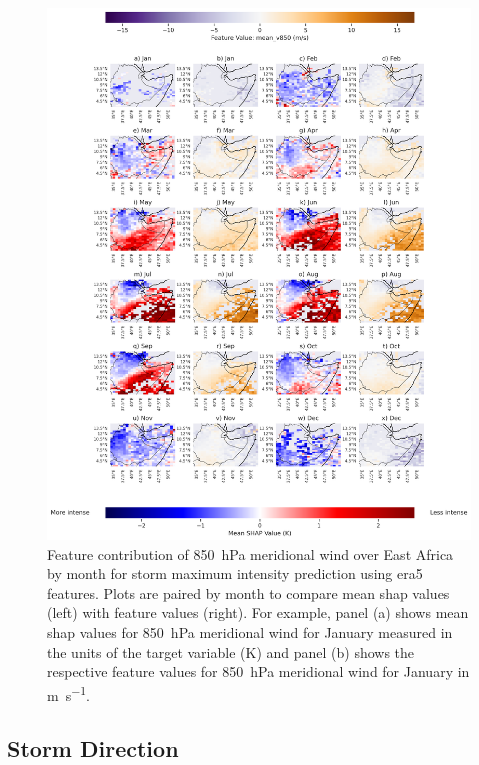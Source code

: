 \begin{figure}[ht]
    \centering
    \includegraphics[width=\textwidth]{../figures/generated/experiments/storm_max_intensity/geographic_corr/storm_max_intensity_era5_shap_mean_v850_map_by_month.png}
    \caption{Feature contribution of \SI{850}{\hecto\pascal} meridional wind over East Africa by month for storm maximum intensity prediction using \acrshort{era5} features. Plots are paired by month to compare mean \acrshort{shap} values (left) with feature values (right). For example, panel (a) shows mean \acrshort{shap} values for \SI{850}{\hecto\pascal} meridional wind for January measured in the units of the target variable (\unit{\kelvin}) and panel (b) shows the respective feature values for \SI{850}{\hecto\pascal} meridional wind for January in \unit{\meter\per\second}.}
    \label{fig:storm_max_intensity_era5_shap_mean_v850_map_by_month}
\end{figure}

\clearpage
\subsection{Storm Direction}

